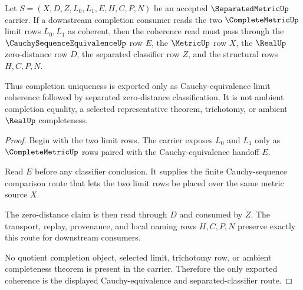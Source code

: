 \begin{theorem}
\label{thm:separatedmetric-cauchy-equivalence-limit-coherence}
Let $S=(X,D,Z,L_0,L_1,E,H,C,P,N)$ be an accepted $\SeparatedMetricUp$ carrier. If a downstream completion consumer reads the two $\CompleteMetricUp$ limit rows $L_0,L_1$ as coherent, then the coherence read must pass through the $\CauchySequenceEquivalenceUp$ row $E$, the $\MetricUp$ row $X$, the $\RealUp$ zero-distance row $D$, the separated classifier row $Z$, and the structural rows $H,C,P,N$.

Thus completion uniqueness is exported only as Cauchy-equivalence limit coherence followed by separated zero-distance classification. It is not ambient completion equality, a selected representative theorem, trichotomy, or ambient $\RealUp$ completeness.
\end{theorem}
\begin{proof}
Begin with the two limit rows. The carrier exposes $L_0$ and $L_1$ only as $\CompleteMetricUp$ rows paired with the Cauchy-equivalence handoff $E$.

Read $E$ before any classifier conclusion. It supplies the finite Cauchy-sequence comparison route that lets the two limit rows be placed over the same metric source $X$.

The zero-distance claim is then read through $D$ and consumed by $Z$. The transport, replay, provenance, and local naming rows $H,C,P,N$ preserve exactly this route for downstream consumers.

No quotient completion object, selected limit, trichotomy row, or ambient completeness theorem is present in the carrier. Therefore the only exported coherence is the displayed Cauchy-equivalence and separated-classifier route.
\end{proof}

